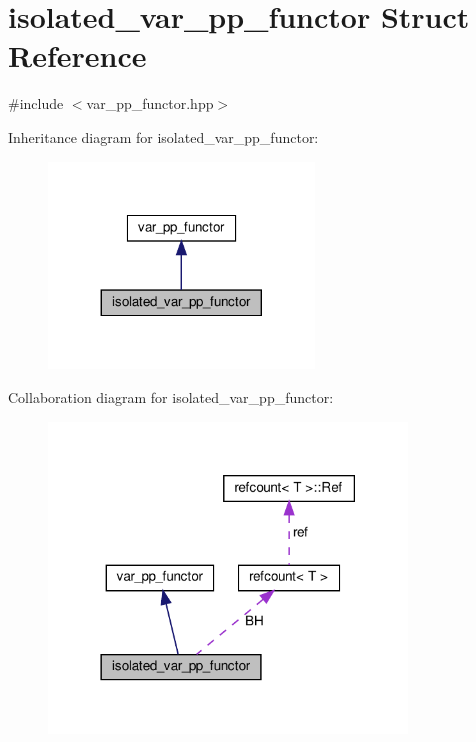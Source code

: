 \hypertarget{structisolated__var__pp__functor}{}\section{isolated\+\_\+var\+\_\+pp\+\_\+functor Struct Reference}
\label{structisolated__var__pp__functor}


{\ttfamily \#include $<$var\+\_\+pp\+\_\+functor.\+hpp$>$}



Inheritance diagram for isolated\+\_\+var\+\_\+pp\+\_\+functor\+:
\nopagebreak
\begin{figure}[H]
\begin{center}
\leavevmode
\includegraphics[width=200pt]{db/d7f/structisolated__var__pp__functor__inherit__graph}
\end{center}
\end{figure}


Collaboration diagram for isolated\+\_\+var\+\_\+pp\+\_\+functor\+:
\nopagebreak
\begin{figure}[H]
\begin{center}
\leavevmode
\includegraphics[width=270pt]{d2/d78/structisolated__var__pp__functor__coll__graph}
\end{center}
\end{figure}
